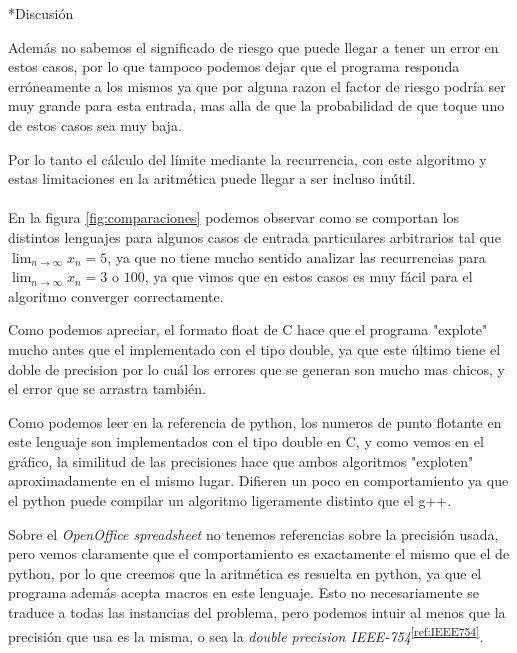 \documentclass[12pt,titlepage]{article}
\newenvironment{usection}[1]{\newpage\begin{section}*{#1}	\addcontentsline{toc}{section}{#1}}{\end{section}}
\newcommand{\superref}[1]{\textsuperscript{\ref{#1}}}
\begin{document}
\begin{usection}{Discusión}
		Además no sabemos el significado de riesgo que puede llegar a tener
		un error en estos casos, por lo que tampoco podemos dejar que
		el programa responda erróneamente a los mismos ya que
		por alguna razon el factor de riesgo podría ser muy grande para esta entrada,
		mas alla de que la probabilidad de que toque uno de estos casos sea muy baja.

		Por lo tanto el cálculo del límite mediante la recurrencia,
		con este algoritmo y estas limitaciones en la aritmética puede llegar a ser incluso inútil. \\
\\
		En la figura \ref{fig:comparaciones} podemos observar como se comportan
		los distintos lenguajes para algunos casos de entrada
		particulares arbitrarios tal que $\lim_{n\to\infty} x_n = 5$,
		ya que no tiene mucho sentido analizar las recurrencias
		para $\lim_{n\to\infty} x_n = 3$ o $100$,
		ya que vimos que en estos casos es muy fácil para el algoritmo
		converger correctamente.

		Como podemos apreciar, el formato float de C hace
		que el programa "explote" mucho antes que el implementado
		con el tipo double, ya que este último tiene el doble de precision
		por lo cuál los errores que se generan son mucho mas chicos,
		y el error que se arrastra también.

		Como podemos leer en la referencia de python,
		los numeros de punto flotante en este lenguaje
		son implementados con el tipo double en C, y como vemos en el gráfico,
		la similitud de las precisiones hace que ambos algoritmos
		"exploten" aproximadamente en el mismo lugar.
		Difieren un poco en comportamiento ya que el python
		puede compilar un algoritmo ligeramente distinto que el g++.

		Sobre el \textit{OpenOffice spreadsheet} no tenemos referencias sobre la precisión usada,
		pero vemos claramente que el comportamiento es exactamente el mismo que el de python,
		por lo que creemos que la aritmética es resuelta en python,
		ya que el programa además acepta macros en este lenguaje.
		Esto no necesariamente se traduce a todas las instancias del problema,
		pero podemos intuir al menos que la precisión que usa es la misma,
		o sea la \textit{double precision IEEE-754}\superref{ref:IEEE754}.


\end{usection}
\end{document}

